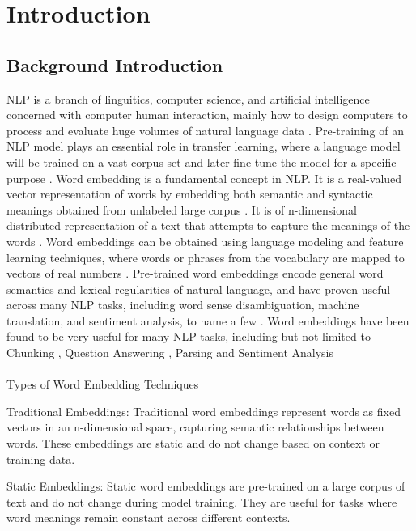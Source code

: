      \chapter{Introduction}
        \section{Background Introduction}
        NLP is a branch of linguitics, computer science, and artificial intelligence concerned with computer human interaction, mainly how to design computers to process and evaluate huge volumes of natural language data \cite{asudani2023impact}. Pre-training of an NLP model plays an essential role in transfer learning, where a language model will be trained on a vast corpus set and later fine-tune the model for a specific purpose \cite{NepaliBERT}. Word embedding is a fundamental concept in NLP. It is a real-valued vector representation of words by embedding both semantic and syntactic meanings obtained from unlabeled large corpus \cite{Wang_Wang_Chen_Wang_Kuo_2019}. It is of n-dimensional distributed representation of a text that attempts to capture the meanings of the words \cite{asudani2023impact}. Word embeddings can be obtained using language modeling and feature learning techniques, where words or phrases from the vocabulary are mapped to vectors of real numbers \cite{enwiki:1219561882}. Pre-trained word embeddings encode general word semantics and lexical regularities of natural language, and have proven useful across many NLP tasks, including word sense disambiguation, machine translation, and sentiment analysis, to name a few \cite{moreo2019wordclass}. Word embeddings have been found to be very useful for many NLP tasks, including but not limited to Chunking \cite{turian-etal-2010-word}, Question Answering \cite{questionanswer}, Parsing and Sentiment Analysis \cite{sentimentanalysis} \cite{wordembedding} \\\\
        Types of Word Embedding Techniques

    Traditional Embeddings:
        Traditional word embeddings represent words as fixed vectors in an n-dimensional space, capturing semantic relationships between words.
        These embeddings are static and do not change based on context or training data.

    Static Embeddings:
        Static word embeddings are pre-trained on a large corpus of text and do not change during model training.
        They are useful for tasks where word meanings remain constant across different contexts.

